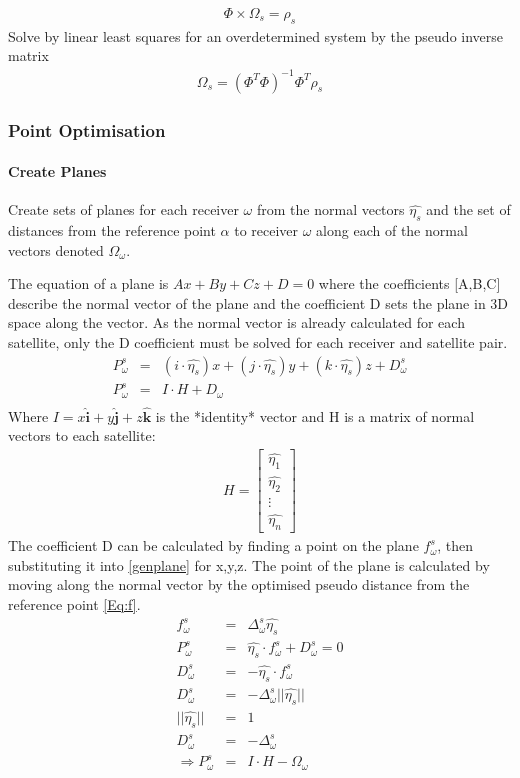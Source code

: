 \documentclass[11pt,a4paper]{article}
\begin{document}
\begin{eqnarray}
\Phi\times\Omega_s = \rho_s
\end{eqnarray}
Solve by linear least squares for an overdetermined system by the pseudo inverse matrix
\begin{eqnarray}
\Omega_s = (\Phi^T\Phi)^{-1}\Phi^T\rho_s
\end{eqnarray}

\subsubsection{Point Optimisation}
\paragraph{Create Planes}
Create sets of planes for each receiver $\omega$ from the normal vectors $\hat{\eta_s}$ and the set of distances from the reference point $\alpha$ to receiver $\omega$ along each of the normal vectors denoted $\Omega_\omega$.

The equation of a plane is $Ax+By+Cz+D=0$ where the coefficients [A,B,C] describe the normal vector of the plane and the coefficient D sets the plane in 3D space along the vector. As the normal vector is already calculated for each satellite, only the D coefficient must be solved for each receiver and satellite pair. 
\begin{eqnarray}
P_\omega^s &=& (i\cdot\hat{\eta_s})x + (j\cdot\hat{\eta_s})y + (k\cdot\hat{\eta_s})z + D_\omega^s \label{genplane}\\
P_\omega^s &=& I\cdot H +D_\omega\\
\end{eqnarray}
Where $I = x\hat{\textbf{i}}+y\hat{\textbf{j}}+z\hat{\textbf{k}}$ is the *identity* vector and H is a matrix of normal vectors to each satellite:
\begin{eqnarray}
H = \begin{bmatrix}
\hat{\eta_1} \\
\hat{\eta_2} \\
\vdots\\
\hat{\eta_n}
\end{bmatrix}
\end{eqnarray}
The coefficient D can be calculated by finding a point on the plane $f_\omega^s$, then substituting it into \eqref{genplane} for x,y,z. The point of the plane is calculated by moving along the normal vector by the optimised pseudo distance from the reference point \eqref{Eq:f}.
\begin{eqnarray}
f_\omega^s &=& \Delta_\omega^s\hat{\eta_s} \label{Eq:f}\\
P_\omega^s &=& \hat{\eta_s}\cdot f_\omega^s +D_\omega^s = 0\\
D_\omega^s &=& -\hat{\eta_s}\cdot f_\omega^s\\
D_\omega^s &=& -\Delta_\omega^s ||\hat{\eta_s}|| \\
||\hat{\eta_s}|| &=& 1\\
D_\omega^s &=& -\Delta_\omega^s\\
\Rightarrow P_\omega^s &=& I\cdot H -\Omega_\omega
\end{eqnarray}
\end{document}
